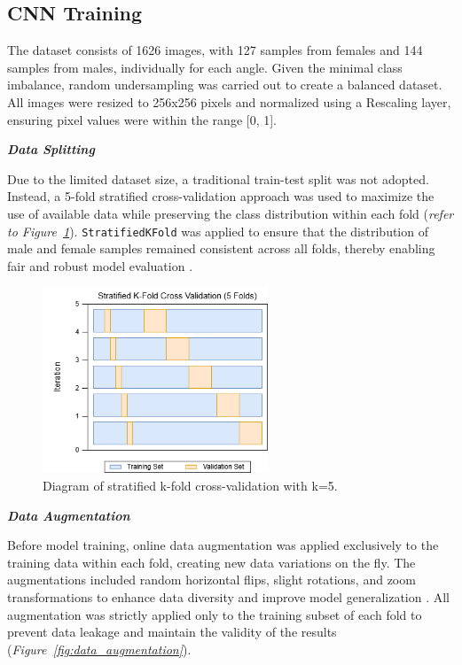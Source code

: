 \subsection{CNN Training}
The dataset consists of 1626 images, with 127 samples from females and 144 samples from males, individually for each angle. Given the minimal class imbalance, random undersampling was carried out to create a balanced dataset. All images were resized to 256x256 pixels and normalized using a Rescaling layer, ensuring pixel values were within the range [0, 1].

\textbf{\textit{Data Splitting}}

Due to the limited dataset size, a traditional train-test split was not adopted. Instead, a 5-fold stratified cross-validation approach was used to maximize the use of available data while preserving the class distribution within each fold (\textit{refer to Figure~\ref{fig:skfold}}). \texttt{StratifiedKFold} was applied to ensure that the distribution of male and female samples remained consistent across all folds, thereby enabling fair and robust model evaluation \cite{stratifiedKFold2020}.

\begin{figure}[h]
	\centering
	\includegraphics[width=0.6\textwidth]{figures/skf.png}
	\caption{Diagram of stratified k-fold cross-validation with k=5.}
	\label{fig:skfold}
\end{figure}

\textbf{\textit{Data Augmentation}}

Before model training, online data augmentation was applied exclusively to the training data within each fold, creating new data variations on the fly. The augmentations included random horizontal flips, slight rotations, and zoom transformations to enhance data diversity and improve model generalization \cite{awan2022}. All augmentation was strictly applied only to the training subset of each fold to prevent data leakage and maintain the validity of the results (\textit{Figure~\ref{fig:data_augmentation}}). 

